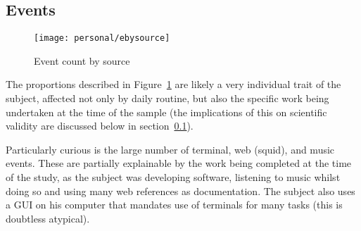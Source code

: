 




\subsection{Events}





\begin{figure}[hp]
    \centering
    \texttt{[image: personal/ebysource]}
    \caption{Event count by source}
    \label{fig:personal:eventsbysource}
\end{figure}

The proportions described in Figure~\ref{fig:personal:eventsbysource} are likely a very individual trait of the subject, affected not only by daily routine, but also the specific work being undertaken at the time of the sample (the implications of this on scientific validity are discussed below in section~\ref{}).

Particularly curious is the large number of terminal, web (squid), and music events.  These are partially explainable by the work being completed at the time of the study, as the subject was developing software, listening to music whilst doing so and using many web references as documentation.  The subject also uses a GUI on his computer that mandates use of terminals for many tasks (this is doubtless atypical).




